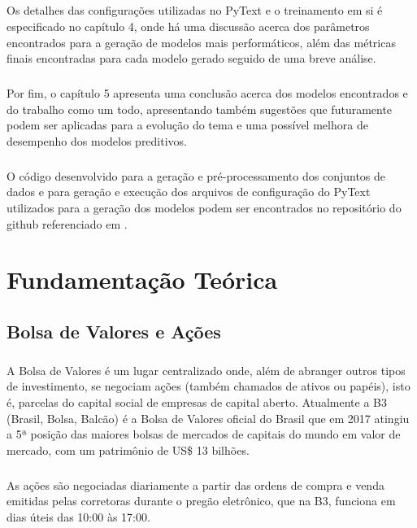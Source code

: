 \documentclass[grad,numbers]{coppe}
\begin{document}
			\paragraph{}Os detalhes das configurações utilizadas no PyText e o treinamento em si é especificado no capítulo 4, onde há uma discussão acerca dos parâmetros encontrados para a geração de modelos mais performáticos, além das métricas finais encontradas para cada modelo gerado seguido de uma breve análise.
			\paragraph{}Por fim, o capítulo 5 apresenta uma conclusão acerca dos modelos encontrados e do trabalho como um todo, apresentando também sugestões que futuramente podem ser aplicadas para a evolução do tema e uma possível melhora de desempenho dos modelos preditivos.
			\paragraph{}O código desenvolvido para a geração e pré-processamento dos conjuntos de dados e para geração e execução dos arquivos de configuração do PyText utilizados para a geração dos modelos podem ser encontrados no repositório do github referenciado em \cite{github}.
   
  \chapter{Fundamentação Teórica}
  
  \section{Bolsa de Valores e Ações}
  	\paragraph{}A Bolsa de Valores é um lugar centralizado onde, além de abranger outros tipos de investimento, se negociam ações (também chamados de ativos ou papéis), isto é, parcelas do capital social de empresas de capital aberto. Atualmente a B3 (Brasil, Bolsa, Balcão) é a Bolsa de Valores oficial do Brasil que em 2017 atingiu a 5ª posição das maiores bolsas de mercados de capitais do mundo em valor de mercado, com um patrimônio de US\$ 13 bilhões\cite{b3-patrimonio}.
  	\paragraph{}As ações são negociadas diariamente a partir das ordens de compra e venda emitidas pelas corretoras durante o pregão eletrônico, que na B3, funciona em dias úteis das 10:00 às 17:00.
\end{document}
